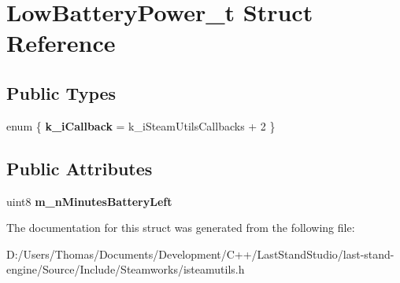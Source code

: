 \hypertarget{structLowBatteryPower__t}{}\section{Low\+Battery\+Power\+\_\+t Struct Reference}
\label{structLowBatteryPower__t}
\subsection*{Public Types}
\begin{DoxyCompactItemize}
\item 
\hypertarget{structLowBatteryPower__t_a67a72fbaebaff375bb882704c70ab7e8}{}enum \{ {\bfseries k\+\_\+i\+Callback} = k\+\_\+i\+Steam\+Utils\+Callbacks + 2
 \}\label{structLowBatteryPower__t_a67a72fbaebaff375bb882704c70ab7e8}

\end{DoxyCompactItemize}
\subsection*{Public Attributes}
\begin{DoxyCompactItemize}
\item 
\hypertarget{structLowBatteryPower__t_a34c3d138bbcf9387f837e89aea70b69b}{}uint8 {\bfseries m\+\_\+n\+Minutes\+Battery\+Left}\label{structLowBatteryPower__t_a34c3d138bbcf9387f837e89aea70b69b}

\end{DoxyCompactItemize}


The documentation for this struct was generated from the following file\+:\begin{DoxyCompactItemize}
\item 
D\+:/\+Users/\+Thomas/\+Documents/\+Development/\+C++/\+Last\+Stand\+Studio/last-\/stand-\/engine/\+Source/\+Include/\+Steamworks/isteamutils.\+h\end{DoxyCompactItemize}
